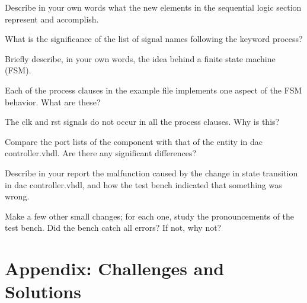 \documentclass[12pt]{article}
\begin{document}
\begin{questionbox}
Describe in your own words what the new elements in the sequential logic section represent and accomplish.
\end{questionbox}

\begin{questionbox}
What is the significance of the list of signal names following the keyword process?
\end{questionbox}

\begin{questionbox}
Briefly describe, in your own words, the idea behind a finite state machine (FSM).
\end{questionbox}

\begin{questionbox}
Each of the process clauses in the example file implements one aspect of the FSM behavior.
What are these?
\end{questionbox}

\begin{questionbox}
The clk and rst signals do not occur in all the process clauses.
Why is this?
\end{questionbox}

\begin{questionbox}
Compare the port lists of the component with that of the entity in dac controller.vhdl.
Are there any significant differences?
\end{questionbox}

\begin{questionbox}
Describe in your report the malfunction caused by the change in state transition in dac controller.vhdl, and how the test bench indicated that something was wrong.
\end{questionbox}

\begin{questionbox}
Make a few other small changes; for each one, study the pronouncements of the test bench.
Did the bench catch all errors?
If not, why not?
\end{questionbox}


\section*{Appendix: Challenges and Solutions}


\printbibliography
\end{document}
